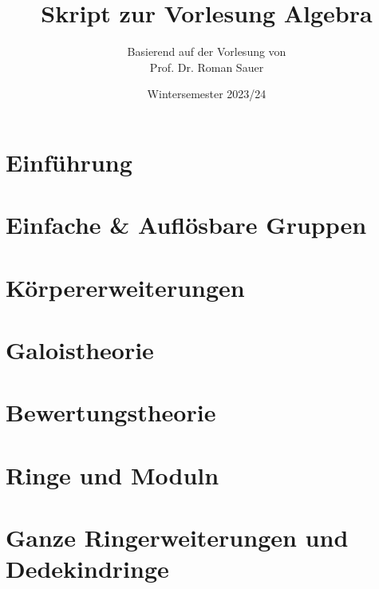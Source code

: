 \documentclass[11pt,a4paper]{article}
\title{Skript zur Vorlesung Algebra}
\author{Basierend auf der Vorlesung von\\Prof. Dr. Roman Sauer}
\date{Wintersemester 2023/24}
\theoremstyle{definition}
\theoremstyle{remark}
\begin{document}
\maketitle
\tableofcontents

\newpage

\section*{Einführung}



\newpage

\section{Einfache \& Auflösbare Gruppen}



\section{Körpererweiterungen}



\section{Galoistheorie}



\section{Bewertungstheorie}


\section{Ringe und Moduln}


\section{Ganze Ringerweiterungen und Dedekindringe}


\printindex
\end{document}
